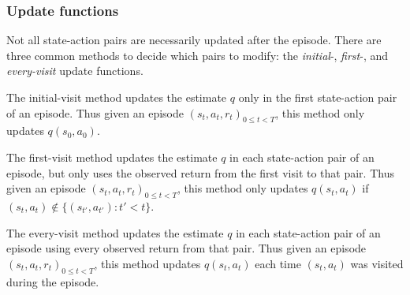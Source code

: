 \subsubsection{Update functions}


Not all state-action pairs are necessarily updated after the episode. There are three common methods to decide which pairs to modify: the \textit{initial}-, \textit{first}-, and \textit{every-visit} update functions.

\begin{definition}
\label{def: initial visit updates}
The initial-visit method updates the estimate $q$ only in the first state-action pair of an episode.
Thus given an episode $(s_t, a_t, r_t)_{0 \le t < T}$, this method only updates $q(s_0, a_0)$.
\end{definition}
\vspace{-0.3cm}

\begin{definition}
The first-visit method updates the estimate $q$ in each state-action pair of an episode, but only uses the observed return from the first visit to that pair.
Thus given an episode $(s_t, a_t, r_t)_{0 \le t < T}$, this method only updates $q(s_t,a_t)$ if $(s_t,a_t) \notin \{(s_{t'},a_{t'}) : t' < t\}$.
\end{definition}
\vspace{-0.3cm}

\begin{definition}
The every-visit method updates the estimate $q$ in each state-action pair of an episode using every observed return from that pair.
Thus given an episode $(s_t, a_t, r_t)_{0 \le t < T}$, this method updates $q(s_t,a_t)$ each time $(s_t,a_t)$ was visited during the episode.
\end{definition}
\vspace{-1.2\parskip}


